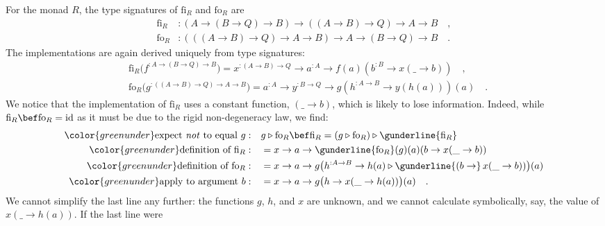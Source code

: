 For the monad $R$, the type signatures of $\text{fi}_{R}$ and $\text{fo}_{R}$
are
\begin{align*}
\text{fi}_{R} & :\left(A\rightarrow\left(B\rightarrow Q\right)\rightarrow B\right)\rightarrow\left(\left(A\rightarrow B\right)\rightarrow Q\right)\rightarrow A\rightarrow B\quad,\\
\text{fo}_{R} & :\left(\left(\left(A\rightarrow B\right)\rightarrow Q\right)\rightarrow A\rightarrow B\right)\rightarrow A\rightarrow\left(B\rightarrow Q\right)\rightarrow B\quad.
\end{align*}
The implementations are again derived uniquely from type signatures:
\begin{align*}
 & \text{fi}_{R}\big(f^{:A\rightarrow\left(B\rightarrow Q\right)\rightarrow B}\big)=x^{:\left(A\rightarrow B\right)\rightarrow Q}\rightarrow a^{:A}\rightarrow f(a)(b^{:B}\rightarrow x(\_\rightarrow b))\quad,\\
 & \text{fo}_{R}\big(g^{:\left(\left(A\rightarrow B\right)\rightarrow Q\right)\rightarrow A\rightarrow B}\big)=a^{:A}\rightarrow y^{:B\rightarrow Q}\rightarrow g(h^{:A\rightarrow B}\rightarrow y(h(a)))(a)\quad.
\end{align*}
We notice that the implementation of $\text{fi}_{R}$ uses a constant
function, $\left(\_\rightarrow b\right)$, which is likely to lose
information. Indeed, while $\text{fi}_{R}\bef\text{fo}_{R}=\text{id}$
as it must be due to the rigid non-degeneracy law, we find:
\begin{align*}
{\color{greenunder}\text{expect \emph{not} to equal }g:}\quad & g\triangleright\text{fo}_{R}\bef\text{fi}_{R}=\left(g\triangleright\text{fo}_{R}\right)\triangleright\gunderline{\text{fi}_{R}}\\
{\color{greenunder}\text{definition of }\text{fi}_{R}:}\quad & =x\rightarrow a\rightarrow\gunderline{\text{fo}_{R}}(g)(a)(b\rightarrow x(\_\rightarrow b))\\
{\color{greenunder}\text{definition of }\text{fo}_{R}:}\quad & =x\rightarrow a\rightarrow g\big(h^{:A\rightarrow B}\rightarrow h(a)\triangleright\gunderline{(b\rightarrow}\,x(\_\rightarrow b))\big)(a)\\
{\color{greenunder}\text{apply to argument }b:}\quad & =x\rightarrow a\rightarrow g\big(h\rightarrow x(\_\rightarrow h(a))\big)(a)\quad.
\end{align*}
We cannot simplify the last line any further: the functions $g$,
$h$, and $x$ are unknown, and we cannot calculate symbolically,
say, the value of $x(\_\rightarrow h(a))$. If the last line were
